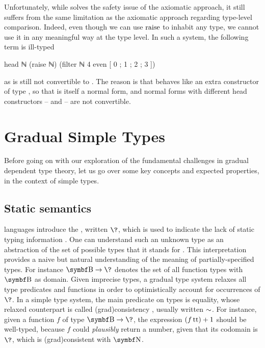 Unfortunately, while  solves the safety issue of the axiomatic approach, it still suffers from the same limitation as the axiomatic approach regarding type-level comparison.
Indeed, even though we can use $\rai$ to inhabit any type,
we cannot use it in any meaningful way at the type level.
In such a system, the following term is ill-typed
\begin{coqcode}
  head ℕ (raise ℕ) (filter ℕ 4 even [ 0 ; 1 ; 2 ; 3 ])
\end{coqcode}
as  is still not convertible to
.
The reason is that  behaves like an extra constructor of type , so
that  is itself a normal form,
and normal forms with different head constructors
–  and  – are not convertible.

\section{Gradual Simple Types}
\label{sec:grad-simple}

Before going on with our exploration of the fundamental challenges in gradual dependent type
theory, let us go over some key concepts and expected properties,
in the context of simple types.

\subsection{Static semantics}

 languages introduce the , written $\?$,
which is used to indicate the lack of static typing information .
One can understand such an unknown type as an abstraction of the
set of possible types that it stands for .
This interpretation provides a naive but natural understanding of the meaning of
partially-specified types. For instance $\Bool \to \?$ denotes the set of all function types
with $\Bool$ as domain.
Given imprecise types, a gradual type system relaxes all type predicates and functions in order
to optimistically account for occurrences of $\?$.
In a simple type system, the main predicate on types is equality, whose relaxed counterpart is called \intro(grad){consistency}%
,
usually written $\sim$.
For instance, given a function $f$ of type $\Bool \to \?$, the expression $(f \operatorname{tt}) + 1$
should be well-typed, because $f$ could \emph{plausibly} return a number,
given that its codomain is $\?$, which is \kl(grad){consistent} with $\Nat$.

